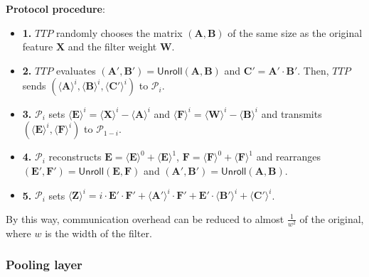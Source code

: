 \documentclass[letterpaper]{article} %
\begin{document}
    \textbf{Protocol procedure}:
    \begin{itemize}
        \item \textbf{1.} $TTP$ randomly chooses the matrix $(\mathbf{A},\mathbf{B})$ of the same size
        as the original feature $\mathbf{X}$ and the filter weight $\mathbf{W}$.
        \item \textbf{2.} $TTP$ evaluates $( \mathbf{A}',\mathbf{B}')=\mathsf{Unroll}(\mathbf{A},\mathbf{B})$
        and $\mathbf{C}' =\mathbf{A}'\cdot \mathbf{B}' $.
        Then, $TTP$ sends $(\langle \mathbf{A}\rangle ^{i},\langle \mathbf{B}\rangle ^{i},\langle \mathbf{C}'\rangle ^{i})$
        to $\mathcal{P}_{i}$.
        \item \textbf{3.} $\mathcal{P}_{i}$ sets $\langle \mathbf{E}\rangle ^{i}=\langle \mathbf{X}\rangle ^{i}-
        \langle \mathbf{A}\rangle ^{i}$
        and $\langle \mathbf{F}\rangle ^{i}=\langle \mathbf{W}\rangle ^{i}-\langle \mathbf{B}\rangle ^{i}$
        and transmits $(\langle \mathbf{E}\rangle ^{i},\langle \mathbf{F}\rangle ^{i})$ to $\mathcal{P}_{1-i}$.
        \item \textbf{4.} $\mathcal{P}_{i}$ reconstructs $\mathbf{E} = \langle \mathbf{E}\rangle ^{0}+\langle \mathbf{E}\rangle ^{1}$,
        $\mathbf{F} = \langle \mathbf{F}\rangle ^{0}+\langle \mathbf{F}\rangle ^{1}$
        and rearranges $(\mathbf{E}',\mathbf{F}')=\mathsf{Unroll}(\mathbf{E},\mathbf{F})$ and $(\mathbf{A}',\mathbf{B}')=\mathsf{Unroll}(\mathbf{A},\mathbf{B})$.
        \item \textbf{5.} $\mathcal{P}_{i}$ sets
        $\langle \mathbf{Z}\rangle^{i}=i\cdot \mathbf{E}' \cdot \mathbf{F}' +
        \langle \mathbf{A}'\rangle^{i} \cdot \mathbf{F}' + \mathbf{E}' \cdot \langle \mathbf{B}'\rangle^{i} + \langle \mathbf{C}'\rangle^{i}$.

    \end{itemize}
    By this way, communication overhead can be reduced to almost $ \frac{1}{w^{2}} $ of the original,
    where $w$ is the width of the filter.


    \subsubsection{Pooling layer}
\end{document}
